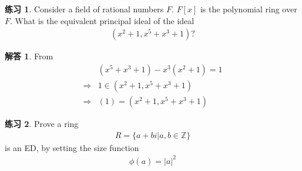 \documentclass[utf8]{ctexbook}
\theoremstyle{definition}
\newtheorem{exercise}{练习}[section]
\newtheorem*{soln}{解答}
\begin{document}
\begin{exercise}
Consider a field of rational numbers $F$. $F[x]$ is the polynomial ring over $F$. What is the equivalent principal ideal of the ideal
\begin{align*}
( x^2 + 1, x^5 + x^3 + 1 ) ?
\end{align*}
\end{exercise}

\begin{soln}
From
\begin{align*}
& (x^5 + x^3 + 1  ) - x^3 (x^2 + 1) = 1 \\
\Longrightarrow & 1 \in ( x^2 + 1, x^5 + x^3 + 1 ) \\
\Longrightarrow & (1) = ( x^2 + 1, x^5 + x^3 + 1 )
\end{align*}

\end{soln}

\begin{exercise}
Prove a ring 
\begin{align*}
R= \{ a + b i | a, b \in \mathbb{Z} \}
\end{align*}
is an ED, by setting the size function
\begin{align*}
\phi(a) = |a|^2
\end{align*}

\end{exercise}
\end{document}
